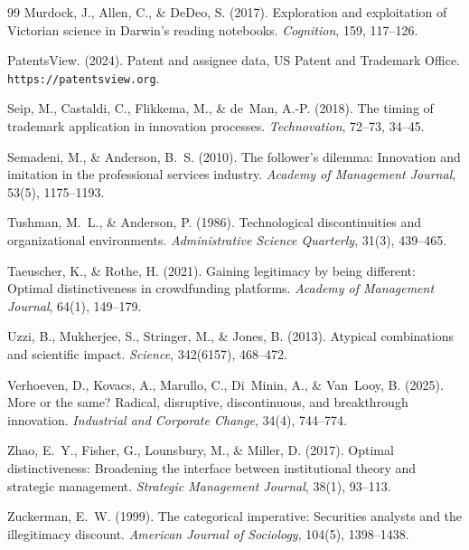 \begin{thebibliography}{99}
Murdock, J., Allen, C., \& DeDeo, S. (2017). Exploration and exploitation
of Victorian science in Darwin's reading notebooks. \emph{Cognition},
159, 117--126.

PatentsView. (2024). Patent and assignee data, US Patent and Trademark
Office. \texttt{https://patentsview.org}.

Seip, M., Castaldi, C., Flikkema, M., \& de~Man, A.-P. (2018). The timing
of trademark application in innovation processes. \emph{Technovation},
72--73, 34--45.

Semadeni, M., \& Anderson, B.~S. (2010). The follower's dilemma:
Innovation and imitation in the professional services industry.
\emph{Academy of Management Journal}, 53(5), 1175--1193.

Tushman, M.~L., \& Anderson, P. (1986). Technological discontinuities and
organizational environments. \emph{Administrative Science Quarterly},
31(3), 439--465.

Taeuscher, K., \& Rothe, H. (2021). Gaining legitimacy by being different:
Optimal distinctiveness in crowdfunding platforms. \emph{Academy of
Management Journal}, 64(1), 149--179.

Uzzi, B., Mukherjee, S., Stringer, M., \& Jones, B. (2013). Atypical
combinations and scientific impact. \emph{Science}, 342(6157), 468--472.

Verhoeven, D., Kovacs, A., Marullo, C., Di~Minin, A., \& Van~Looy, B.
(2025). More or the same? Radical, disruptive, discontinuous, and
breakthrough innovation. \emph{Industrial and Corporate Change}, 34(4),
744--774.

Zhao, E.~Y., Fisher, G., Lounsbury, M., \& Miller, D. (2017). Optimal
distinctiveness: Broadening the interface between institutional theory and
strategic management. \emph{Strategic Management Journal}, 38(1), 93--113.

Zuckerman, E.~W. (1999). The categorical imperative: Securities analysts
and the illegitimacy discount. \emph{American Journal of Sociology},
104(5), 1398--1438.

\end{thebibliography}
